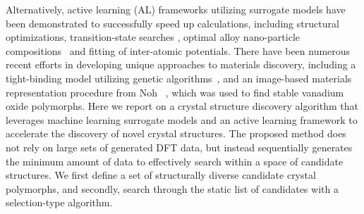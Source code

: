 %
Alternatively, active learning (AL) frameworks utilizing surrogate models have been demonstrated to successfully speed up  calculations, including structural optimizations\cite{hansen2019atomistic}, transition-state searches \cite{torres2019low}, optimal alloy nano-particle compositions~\cite{Jennings2019} and fitting of inter-atomic potentials.\cite{podryabinkin2017active}
%
There have been numerous recent efforts in developing unique approaches to materials discovery, including a tight-binding model utilizing genetic algorithms~\cite{VanDenBossche2018}, and an image-based materials representation procedure from Noh ~\cite{noh2019inverse}, which was used to find stable vanadium oxide polymorphs.
%
Here we report on a crystal structure discovery algorithm that leverages machine learning surrogate models and an active learning framework to accelerate the discovery of novel crystal structures.
%
The proposed method does not rely on large sets of generated DFT data, but instead sequentially generates the minimum amount of data to effectively search within a space of candidate structures.
%
%
We first define a set of structurally diverse candidate crystal polymorphs, and secondly, search through the static list of candidates with a selection-type algorithm.
%
%
%
%


